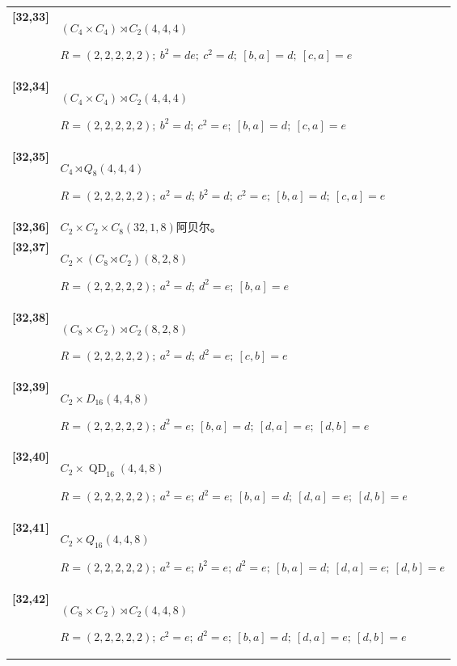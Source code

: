 \documentclass[UTF8,fontset=fandol,11pt,a4paper]{ctexart}
\begin{document}
\begin{longtable}{@{}p{17mm}>{\raggedright\arraybackslash}p{141mm}@{}}
\textbf{[32,33]} & $(C_{4}\times C_{4})\rtimes C_{2}$\quad $(4,4,4)$\par\(R=(2,2,2,2,2);\allowbreak\ b^{2}=de;\allowbreak\ c^{2}=d;\allowbreak\ [b,a]=d;\allowbreak\ [c,a]=e\)\\[3pt]

\textbf{[32,34]} & $(C_{4}\times C_{4})\rtimes C_{2}$\quad $(4,4,4)$\par\(R=(2,2,2,2,2);\allowbreak\ b^{2}=d;\allowbreak\ c^{2}=e;\allowbreak\ [b,a]=d;\allowbreak\ [c,a]=e\)\\[3pt]

\textbf{[32,35]} & $C_{4}\rtimes Q_{8}$\quad $(4,4,4)$\par\(R=(2,2,2,2,2);\allowbreak\ a^{2}=d;\allowbreak\ b^{2}=d;\allowbreak\ c^{2}=e;\allowbreak\ [b,a]=d;\allowbreak\ [c,a]=e\)\\[3pt]

\textbf{[32,36]} & $C_{2}\times C_{2}\times C_{8}$\quad $(32,1,8)$\quad 阿贝尔。\\[3pt]

\textbf{[32,37]} & $C_{2}\times (C_{8}\rtimes C_{2})$\quad $(8,2,8)$\par\(R=(2,2,2,2,2);\allowbreak\ a^{2}=d;\allowbreak\ d^{2}=e;\allowbreak\ [b,a]=e\)\\[3pt]

\textbf{[32,38]} & $(C_{8}\times C_{2})\rtimes C_{2}$\quad $(8,2,8)$\par\(R=(2,2,2,2,2);\allowbreak\ a^{2}=d;\allowbreak\ d^{2}=e;\allowbreak\ [c,b]=e\)\\[3pt]

\textbf{[32,39]} & $C_{2}\times D_{16}$\quad $(4,4,8)$\par\(R=(2,2,2,2,2);\allowbreak\ d^{2}=e;\allowbreak\ [b,a]=d;\allowbreak\ [d,a]=e;\allowbreak\ [d,b]=e\)\\[3pt]

\textbf{[32,40]} & $C_{2}\times \operatorname{QD}_{16}$\quad $(4,4,8)$\par\(R=(2,2,2,2,2);\allowbreak\ a^{2}=e;\allowbreak\ d^{2}=e;\allowbreak\ [b,a]=d;\allowbreak\ [d,a]=e;\allowbreak\ [d,b]=e\)\\[3pt]

\textbf{[32,41]} & $C_{2}\times Q_{16}$\quad $(4,4,8)$\par\(R=(2,2,2,2,2);\allowbreak\ a^{2}=e;\allowbreak\ b^{2}=e;\allowbreak\ d^{2}=e;\allowbreak\ [b,a]=d;\allowbreak\ [d,a]=e;\allowbreak\ [d,b]=e\)\\[3pt]

\textbf{[32,42]} & $(C_{8}\times C_{2})\rtimes C_{2}$\quad $(4,4,8)$\par\(R=(2,2,2,2,2);\allowbreak\ c^{2}=e;\allowbreak\ d^{2}=e;\allowbreak\ [b,a]=d;\allowbreak\ [d,a]=e;\allowbreak\ [d,b]=e\)\\[3pt]


\end{longtable}
\end{document}

